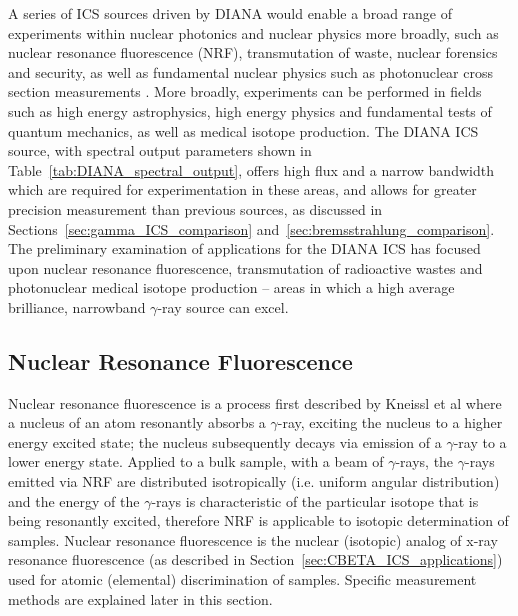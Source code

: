 \documentclass[../main.tex]{subfiles}
\begin{document}
A series of ICS sources driven by DIANA would enable a broad range of experiments within nuclear photonics \cite{nedorezov2017nuclear,budker2021expanding} and nuclear physics more broadly, such as nuclear resonance fluorescence (NRF), transmutation of waste, nuclear forensics and security, as well as fundamental nuclear physics such as photonuclear cross section measurements \cite{renstrom2018verification}.
More broadly, experiments can be performed in fields such as high energy astrophysics, high energy physics and fundamental tests of quantum mechanics, as well as medical isotope production. The DIANA ICS source, with spectral output parameters shown in Table~\ref{tab:DIANA_spectral_output}, offers high flux and a narrow bandwidth which are required for experimentation in these areas, and allows for greater precision measurement than previous sources, as discussed in Sections~\ref{sec:gamma_ICS_comparison} and~\ref{sec:bremsstrahlung_comparison}. The preliminary examination of applications for the DIANA ICS has focused upon nuclear resonance fluorescence, transmutation of radioactive wastes and photonuclear medical isotope production -- areas in which a high average brilliance, narrowband $\gamma$-ray source can excel.  

\subsection{Nuclear Resonance Fluorescence}

Nuclear resonance fluorescence is a process first described by Kneissl et al \cite{kneissl1996investigation} where a nucleus of an atom resonantly absorbs a $\gamma$-ray, exciting the nucleus to a higher energy excited state; the nucleus subsequently decays via emission of a $\gamma$-ray to a lower energy state. Applied to a bulk sample, with a beam of $\gamma$-rays, the $\gamma$-rays emitted via NRF are distributed isotropically (i.e. uniform angular distribution) and the energy of the $\gamma$-rays is characteristic of the particular isotope that is being resonantly excited, therefore NRF is applicable to isotopic determination of samples. Nuclear resonance fluorescence is the nuclear (isotopic) analog of x-ray resonance fluorescence (as described in Section~\ref{sec:CBETA_ICS_applications}) used for atomic (elemental) discrimination of samples. Specific measurement methods are explained later in this section. 
\end{document}
